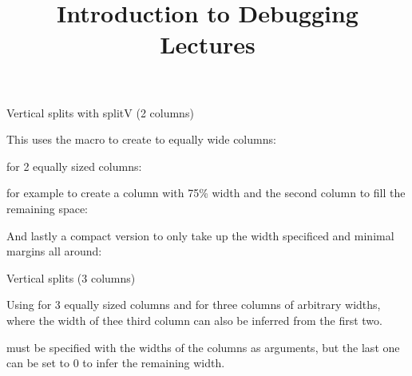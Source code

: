 \documentclass[11pt,compress,t,notes=noshow, xcolor=table]{beamer}
\title{Introduction to Debugging Lectures}
\begin{document}

\begin{vbframe}{Vertical splits with splitV (2 columns)}

This uses the  macro to create to equally wide columns:

 for 2 equally sized columns:

\vfill


\vfill

 for example to create a column with 75\% width and the
 second column to fill the remaining space:

\vfill


\vfill

And lastly a compact version  to only take up the width specificed and minimal margins all around:

\vfill


\vfill


\end{vbframe}

\begin{vbframe}{Vertical splits  (3 columns)}

Using  for 3 equally sized columns and  for three columns of 
arbitrary widths, where the width of thee third column can also be inferred from the first two.
\vfill


\vfill

 must be specified with the widths of the columns as arguments, but the last 
one can be set to 0 to infer the remaining width.

\vfill




\end{vbframe}
\end{document}
